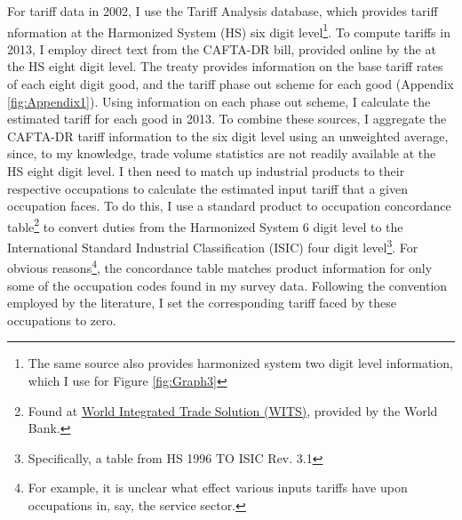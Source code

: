\documentclass[12pt]{article}
\begin{document}
For tariff data in 2002, 
I use the \citet{wtotariff} Tariff Analysis database, which provides tariff nformation 
at the Harmonized System (HS) six digit level\footnote{The same source
also provides harmonized system two digit level information,
which I use for Figure \ref{fig:Graph3}}. To compute tariffs in 2013, 
I employ direct text from the CAFTA-DR bill, provided online by the 
\citet{ustraderep} at the HS eight digit level. The treaty provides
information on the base tariff rates of each eight digit good, and the tariff phase out
scheme for each good (Appendix \ref{fig:Appendix1}).
Using information on each phase out scheme, I calculate the estimated tariff
for each good in 2013. To combine these sources, I aggregate
the CAFTA-DR tariff information to the six digit level using an unweighted average, 
since, to my knowledge, trade volume statistics are not readily available at the HS eight digit level.
I then need to match up industrial products to their respective occupations to calculate
the estimated input tariff that a given occupation faces. 
To do this, I use a standard product to occupation concordance table\footnote{Found at 
\href{http://wits.worldbank.org/product_concordance.html}{World Integrated Trade Solution (WITS)}, 
provided by the World Bank.} to convert duties from the Harmonized System 6 digit level to the 
International Standard Industrial Classification (ISIC) four digit 
level\footnote{Specifically, a table from HS 1996 TO ISIC Rev. 3.1}.
For obvious reasons\footnote{For example, it is unclear what effect various inputs tariffs have
upon occupations in, say, the service sector.}, the concordance table matches product information
for only some of the occupation codes found in my survey data. Following the convention employed 
by the literature, I set the corresponding tariff faced by these occupations to zero.
\end{document}
